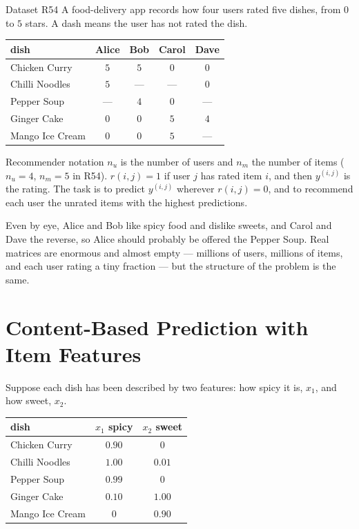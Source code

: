 \begin{defbox}{Dataset R54}
A food-delivery app records how four users rated five dishes, from $0$ to $5$
stars. A dash means the user has not rated the dish.

\begin{center}
\small
\renewcommand{\arraystretch}{1.15}
\begin{tabular}{@{}lcccc@{}}
\toprule
dish & Alice & Bob & Carol & Dave\\
\midrule
Chicken Curry   & $5$ & $5$ & $0$ & $0$\\
Chilli Noodles  & $5$ & --- & --- & $0$\\
Pepper Soup     & --- & $4$ & $0$ & ---\\
Ginger Cake     & $0$ & $0$ & $5$ & $4$\\
Mango Ice Cream & $0$ & $0$ & $5$ & ---\\
\bottomrule
\end{tabular}
\end{center}
\end{defbox}

\begin{defbox}{Recommender notation}
$n_u$ is the number of users and $n_m$ the number of items ($n_u = 4$, $n_m = 5$
in R54). $r(i,j) = 1$ if user $j$ has rated item $i$, and then $y^{(i,j)}$ is
the rating. The task is to predict $y^{(i,j)}$ wherever $r(i,j) = 0$, and to
recommend each user the unrated items with the highest predictions.
\end{defbox}

Even by eye, Alice and Bob like spicy food and dislike sweets, and Carol and Dave
the reverse, so Alice should probably be offered the Pepper Soup. Real matrices
are enormous and almost empty --- millions of users, millions of items, and each
user rating a tiny fraction --- but the structure of the problem is the same.

\section{Content-Based Prediction with Item Features}
\label{sec:content-based}

Suppose each dish has been described by two features: how spicy it is, $x_1$,
and how sweet, $x_2$.

\begin{center}
\small
\renewcommand{\arraystretch}{1.15}
\begin{tabular}{@{}lcc@{}}
\toprule
dish & $x_1$ spicy & $x_2$ sweet\\
\midrule
Chicken Curry   & $0.90$ & $0$\\
Chilli Noodles  & $1.00$ & $0.01$\\
Pepper Soup     & $0.99$ & $0$\\
Ginger Cake     & $0.10$ & $1.00$\\
Mango Ice Cream & $0$    & $0.90$\\
\bottomrule
\end{tabular}
\end{center}

